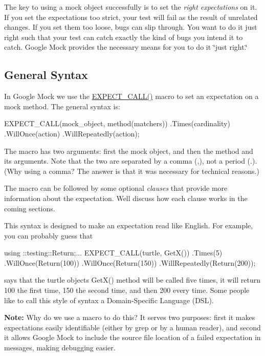 The key to using a mock object successfully is to set the {\itshape right expectations} on it. If you set the expectations too strict, your test will fail as the result of unrelated changes. If you set them too loose, bugs can slip through. You want to do it just right such that your test can catch exactly the kind of bugs you intend it to catch. Google Mock provides the necessary means for you to do it \char`\"{}just right.\char`\"{}

\subsection*{General Syntax}

In Google Mock we use the {\ttfamily \hyperlink{gmock-spec-builders_8h_a535a6156de72c1a2e25a127e38ee5232}{E\+X\+P\+E\+C\+T\+\_\+\+C\+A\+L\+L()}} macro to set an expectation on a mock method. The general syntax is\+:


\begin{DoxyCode}
EXPECT\_CALL(mock\_object, method(matchers))
    .Times(cardinality)
    .WillOnce(action)
    .WillRepeatedly(action);
\end{DoxyCode}


The macro has two arguments\+: first the mock object, and then the method and its arguments. Note that the two are separated by a comma ({\ttfamily ,}), not a period ({\ttfamily .}). (Why using a comma? The answer is that it was necessary for technical reasons.)

The macro can be followed by some optional {\itshape clauses} that provide more information about the expectation. We\textquotesingle{}ll discuss how each clause works in the coming sections.

This syntax is designed to make an expectation read like English. For example, you can probably guess that


\begin{DoxyCode}
using ::testing::Return;...
EXPECT\_CALL(turtle, GetX())
    .Times(5)
    .WillOnce(Return(100))
    .WillOnce(Return(150))
    .WillRepeatedly(Return(200));
\end{DoxyCode}


says that the {\ttfamily turtle} object\textquotesingle{}s {\ttfamily Get\+X()} method will be called five times, it will return 100 the first time, 150 the second time, and then 200 every time. Some people like to call this style of syntax a Domain-\/\+Specific Language (D\+SL).

{\bfseries Note\+:} Why do we use a macro to do this? It serves two purposes\+: first it makes expectations easily identifiable (either by {\ttfamily grep} or by a human reader), and second it allows Google Mock to include the source file location of a failed expectation in messages, making debugging easier.

